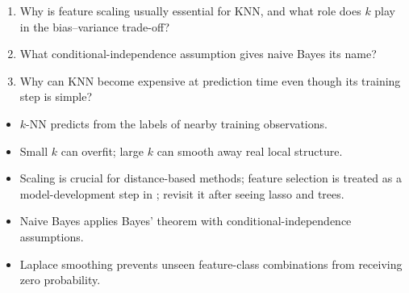 

\begin{quickcheck}
\begin{enumerate}
  \item Why is feature scaling usually essential for KNN, and what role does \(k\) play in the bias--variance trade-off?
  \item What conditional-independence assumption gives naive Bayes its name?
  \item Why can KNN become expensive at prediction time even though its training step is simple?
\end{enumerate}
\end{quickcheck}

\begin{chapterrecap}
\begin{itemize}
  \item $k$-NN predicts from the labels of nearby training observations.
  \item Small $k$ can overfit; large $k$ can smooth away real local structure.
  \item Scaling is crucial for distance-based methods; feature selection is treated as a model-development step in ; revisit it after seeing lasso and trees.
  \item Naive Bayes applies Bayes' theorem with conditional-independence assumptions.
  \item Laplace smoothing prevents unseen feature-class combinations from receiving zero probability.
\end{itemize}
\end{chapterrecap}
